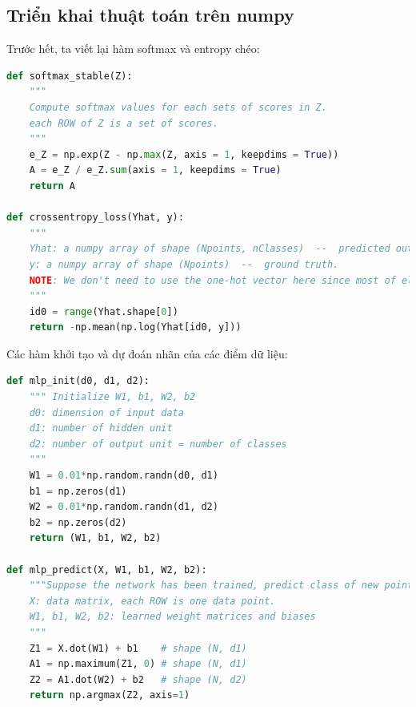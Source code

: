 \subsection{Triển khai thuật toán trên numpy}
Trước hết, ta viết lại hàm softmax và entropy chéo:
\begin{lstlisting}[language=Python]
def softmax_stable(Z):
    """
    Compute softmax values for each sets of scores in Z.
    each ROW of Z is a set of scores.
    """
    e_Z = np.exp(Z - np.max(Z, axis = 1, keepdims = True))
    A = e_Z / e_Z.sum(axis = 1, keepdims = True)
    return A

def crossentropy_loss(Yhat, y):
    """
    Yhat: a numpy array of shape (Npoints, nClasses)  --  predicted output
    y: a numpy array of shape (Npoints)  --  ground truth.
    NOTE: We don't need to use the one-hot vector here since most of elements are zeros. When programming in numpy, in each row of Yhat, we need to access to the corresponding index only.
    """
    id0 = range(Yhat.shape[0])
    return -np.mean(np.log(Yhat[id0, y]))
\end{lstlisting}
Các hàm khởi tạo và dự đoán nhãn của các điểm dữ liệu:
\begin{lstlisting}[language=Python]
def mlp_init(d0, d1, d2):
    """ Initialize W1, b1, W2, b2
    d0: dimension of input data
    d1: number of hidden unit
    d2: number of output unit = number of classes
    """
    W1 = 0.01*np.random.randn(d0, d1)
    b1 = np.zeros(d1)
    W2 = 0.01*np.random.randn(d1, d2)
    b2 = np.zeros(d2)
    return (W1, b1, W2, b2)

def mlp_predict(X, W1, b1, W2, b2):
    """Suppose the network has been trained, predict class of new points.
    X: data matrix, each ROW is one data point.
    W1, b1, W2, b2: learned weight matrices and biases
    """
    Z1 = X.dot(W1) + b1    # shape (N, d1)
    A1 = np.maximum(Z1, 0) # shape (N, d1)
    Z2 = A1.dot(W2) + b2   # shape (N, d2)
    return np.argmax(Z2, axis=1)

\end{lstlisting}

